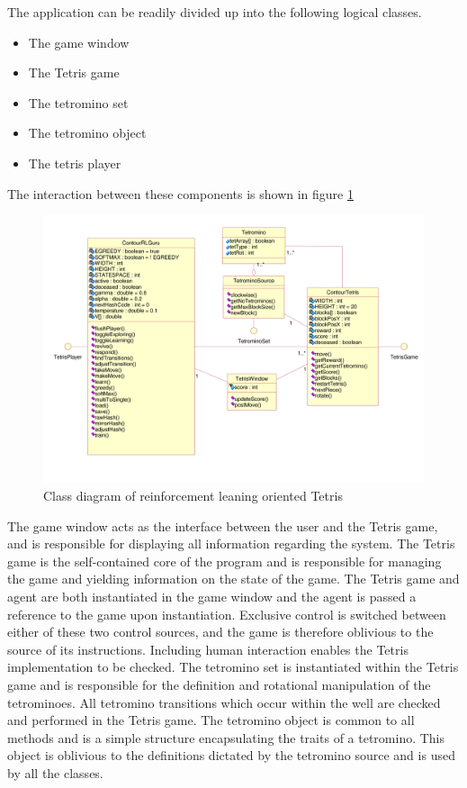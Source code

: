 \documentclass{rucsthesis}
\begin{document}
The application can be readily divided up into the following logical classes.

\begin{itemize}
\item{The game window}
\item{The Tetris game}
\item{The tetromino set}
\item{The tetromino object}
\item{The tetris player}
\end{itemize}

The interaction between these components is shown in figure \ref{fig:uml}

\begin{figure}[h]
\centering
\includegraphics[width=6in]{finaluml.png}
\caption{Class diagram of reinforcement leaning oriented Tetris}
\label{fig:uml}
\end{figure}

The game window acts as the interface between the user and the Tetris game, and is responsible for displaying all information regarding the system. The Tetris game is the self-contained core of the program and is responsible for managing the game and yielding information on the state of the game. The Tetris game and agent are both instantiated in the game window and the agent is passed a reference to the game upon instantiation. Exclusive control is switched between either of these two control sources, and the game is therefore oblivious to the source of its instructions.  Including human interaction enables the Tetris implementation to be checked. The tetromino set is instantiated within the Tetris game and is responsible for the definition and rotational manipulation of the tetrominoes. All tetromino transitions which occur within the well are checked and performed in the Tetris game. The tetromino object is common to all methods and is a simple structure encapsulating the traits of a tetromino. This object is oblivious to the definitions dictated by the tetromino source and is used by all the classes.
\end{document}
